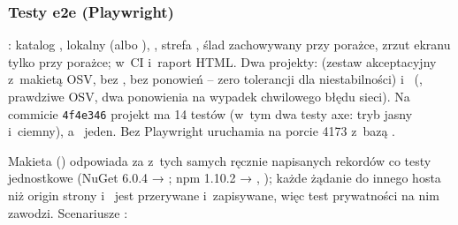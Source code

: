 \subsubsection{Testy e2e (Playwright)}

: katalog , lokalny 
 (albo ),
 , strefa , ślad zachowywany przy porażce,
zrzut ekranu tylko przy porażce; w~CI  i~raport HTML. Dwa projekty:
 (zestaw akceptacyjny z~makietą OSV, bez , bez ponowień --
zero tolerancji dla niestabilności) i~ (, prawdziwe OSV, dwa
ponowienia na wypadek chwilowego błędu sieci). Na commicie \texttt{4f4e346} projekt
 ma 14 testów (w~tym dwa testy axe: tryb jasny i~ciemny), a~
jeden. Bez
 Playwright uruchamia
 na porcie 4173 z~bazą .

Makieta () odpowiada za  z~tych samych ręcznie napisanych
rekordów co testy jednostkowe (NuGet  6.0.4 →
; npm  1.10.2 → ,
); każde żądanie do innego hosta niż origin strony
i~ jest przerywane i~zapisywane, więc test prywatności na nim zawodzi.
Scenariusze :

